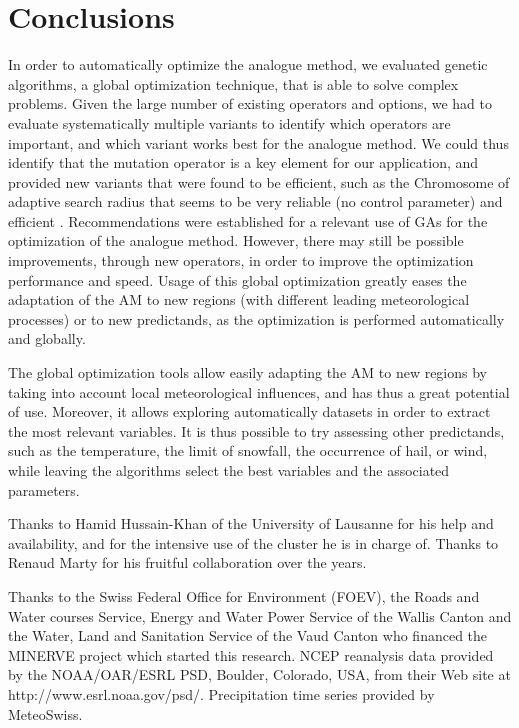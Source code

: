 \documentclass[twocol]{ametsoc}
\begin{document}
\section{Conclusions}


In order to automatically optimize the analogue method, we evaluated genetic algorithms, a global optimization technique, that is able to solve complex problems. Given the large number of existing operators and options, we had to evaluate systematically multiple variants to identify which operators are important, and which variant works best for the analogue method. We could thus identify that the mutation operator is a key element for our application, and provided new variants that were found to be efficient, such as the Chromosome of adaptive search radius that seems to be very reliable (no control parameter) and efficient . Recommendations were established for a relevant use of GAs for the optimization of the analogue method. However, there may still be possible improvements, through new operators, in order to improve the optimization performance and speed. Usage of this global optimization greatly eases the adaptation of the AM to new regions (with different leading meteorological processes) or to new predictands, as the optimization is performed automatically and globally.





The global optimization tools allow easily adapting the AM to new regions by taking into account local meteorological influences, and has thus a great potential of use. Moreover, it allows exploring automatically datasets in order to extract the most relevant variables. It is thus possible to try assessing other predictands, such as the temperature, the limit of snowfall, the occurrence of hail, or wind, while leaving the algorithms select the best variables and the associated parameters.


%
\acknowledgments
Thanks to Hamid Hussain-Khan of the University of Lausanne for his help and availability, and for the intensive use of the cluster he is in charge of. Thanks to Renaud Marty for his fruitful collaboration over the years.

Thanks to the Swiss Federal Office for Environment (FOEV), the Roads and Water courses Service, Energy and Water Power Service of the Wallis Canton and the Water, Land and Sanitation Service of the Vaud Canton who financed the MINERVE project which started this research. NCEP reanalysis data provided by the NOAA/OAR/ESRL PSD, Boulder, Colorado, USA, from their Web site at http://www.esrl.noaa.gov/psd/. Precipitation time series provided by MeteoSwiss. 
\end{document}
